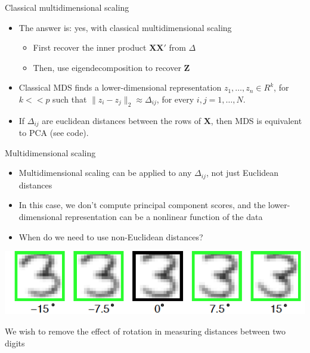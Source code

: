 \documentclass[14pt]{beamer}
\begin{document}
\begin{frame}{\normalsize Classical multidimensional scaling}

\begin{itemize}
	\item The answer is: yes, with classical multidimensional scaling
		\begin{itemize}
		\item First recover the inner product $\bm{XX'}$ from $\Delta$
		\item Then, use eigendecomposition to recover $\bm{Z}$
		\end{itemize}
	\item Classical MDS finds a lower-dimensional representation $z_1, \dots, z_n \in R^k$, for $k << p$ such that $\lVert z_i - z_j \rVert_2 \approx \Delta_{ij}$, for every $i, j = 1, \dots, N$.
	\item If $\Delta_{ij}$ are euclidean distances between the rows of $\bm{X}$, then MDS is equivalent to PCA (see code).
\end{itemize}

\end{frame}


\begin{frame}{Multidimensional scaling}

\begin{itemize}
\item Multidimensional scaling can be applied to any $\Delta_{ij}$, not just Euclidean distances
\item In this case, we don't compute principal component scores, and the lower-dimensional representation can be a nonlinear function of the data 
\item When do we need to use non-Euclidean distances?
\end{itemize}

\centerline{\includegraphics[width=.6\textwidth]{digits}}
We wish to remove the effect of rotation in measuring distances between two digits





\end{frame}
\end{document}
